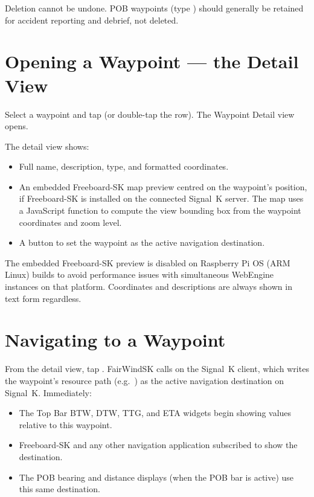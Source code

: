\begin{warningbox}
Deletion cannot be undone.
POB waypoints (type ) should generally be retained for accident reporting and debrief,
not deleted.
\end{warningbox}

\section{Opening a Waypoint --- the Detail View}

Select a waypoint and tap  (or double-tap the row).
The Waypoint Detail view opens.


The detail view shows:

\begin{itemize}
  \item Full name, description, type, and formatted coordinates.
  \item An embedded Freeboard-SK map preview centred on the waypoint's position, if Freeboard-SK is installed on the connected Signal~K server. The map uses a JavaScript function to compute the view bounding box from the waypoint coordinates and zoom level.
  \item A  button to set the waypoint as the active navigation destination.
\end{itemize}

\begin{notebox}
The embedded Freeboard-SK preview is disabled on Raspberry Pi OS (ARM Linux) builds to avoid
performance issues with simultaneous WebEngine instances on that platform.
Coordinates and descriptions are always shown in text form regardless.
\end{notebox}

\section{Navigating to a Waypoint}

From the detail view, tap .
FairWindSK calls  on the Signal~K client, which writes the waypoint's
resource path (e.g.\ ) as the active navigation destination on
Signal~K.
Immediately:

\begin{itemize}
  \item The Top Bar BTW, DTW, TTG, and ETA widgets begin showing values relative to this waypoint.
  \item Freeboard-SK and any other navigation application subscribed to  show the destination.
  \item The POB bearing and distance displays (when the POB bar is active) use this same destination.
\end{itemize}


